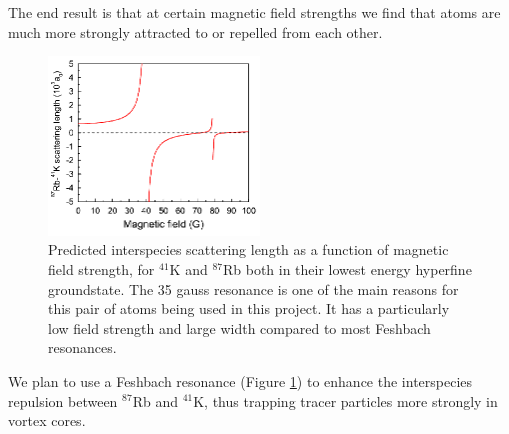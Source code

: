 The end result is that at certain magnetic field strengths we find that atoms are much more strongly attracted to or repelled from each other.

\begin{figure}%
\begin{center}
\includegraphics[width=0.5\textwidth]{figures/unsorted/feshKRb.png}
\caption{Predicted interspecies scattering length \cite{thalhammer_double_2008} as a function of magnetic field strength, for $^{41}$K and $^{87}$Rb both in their lowest energy hyperfine groundstate. The 35 gauss resonance is one of the main reasons for this pair of atoms being used in this project. It has a particularly low field strength and large width compared to most Feshbach resonances.}\label{fig:feshKRb}
\end{center}
\end{figure}

We plan to use a Feshbach resonance (Figure \ref{fig:feshKRb}) to enhance the interspecies repulsion between $^{87}$Rb and $^{41}$K, thus trapping tracer particles more strongly in vortex cores.
